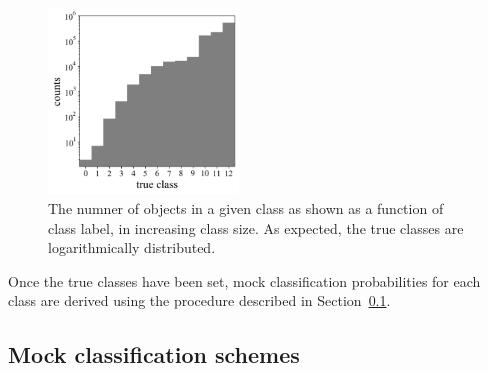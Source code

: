 \begin{figure}
	\begin{center}
    \includegraphics[width=0.45\textwidth]{./fig/complete_counts.png}
		\caption{The numner of objects in a given class as shown as a function of class label, in increasing class size. As expected, the true classes are logarithmically distributed.}
		\label{fig:classdist}
	\end{center}
\end{figure}

Once the true classes have been set, mock classification probabilities for each class are derived using the procedure described in Section~\ref{sec:mockdata}.

\subsection{Mock classification schemes}
\label{sec:mockdata}

